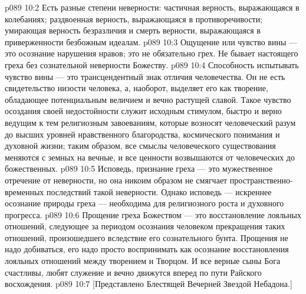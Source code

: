 \vs p089 10:2 \pc {} Есть разные степени неверности: частичная верность, выражающаяся в колебаниях; раздвоенная верность, выражающаяся в противоречивости; умирающая верность безразличия и смерть верности, выражающаяся в приверженности безбожным идеалам.
\vs p089 10:3 \pc Ощущение или чувство вины --- это осознание нарушения нравов; это не обязательно грех. Не бывает настоящего греха без сознательной неверности Божеству.
\vs p089 10:4 Способность испытывать чувство вины --- это трансцендентный знак отличия человечества. Он не есть свидетельство низости человека, а, наоборот, выделяет его как творение, обладающее потенциальным величием и вечно растущей славой. Такое чувство осоздания своей недостойности служит исходным стимулом, быстро и верно ведущим к тем религиозным завоеваниям, которые возносят человеческий разум до высших уровней нравственного благородства, космического понимания и духовной жизни; таким образом, все смыслы человеческого существования меняются с земных на вечные, и все ценности возвышаются от человеческих до божественных.
\vs p089 10:5 Исповедь, признание греха --- это мужественное отречение от неверности, но она никоим образом не смягчает пространственно\hyp{}временных последствий такой неверности. Однако исповедь --- искреннее осознание природы греха --- необходима для религиозного роста и духовного прогресса.
\vs p089 10:6 Прощение греха Божеством --- это восстановление лояльных отношений, следующее за периодом осознания человеком прекращения таких отношений, произошедшего вследствие его сознательного бунта. Прощения не надо добиваться, его надо просто воспринимать как осознание восстановления лояльных отношений между творением и Творцом. И все верные сыны Бога счастливы, любят служение и вечно движутся вперед по пути Райского восхождения.
\vsetoff
\vs p089 10:7 [Представлено Блестящей Вечерней Звездой Небадона.]

